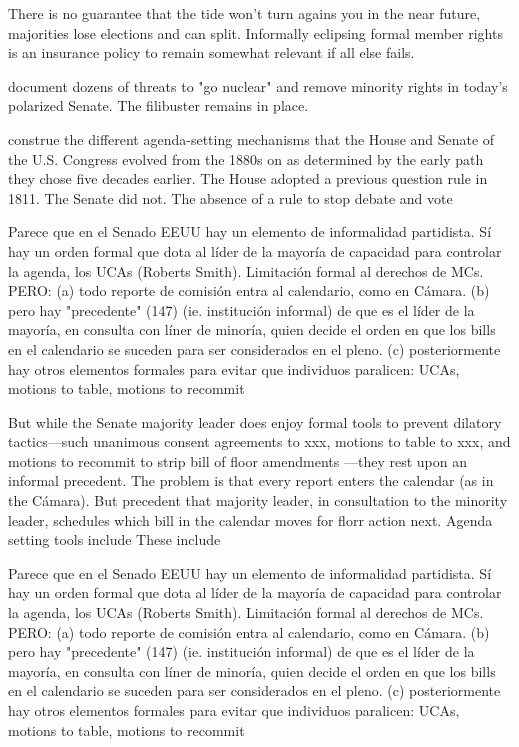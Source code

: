 There is no guarantee that the tide won't turn agains you in the near future, majorities lose elections and can split. Informally eclipsing formal member rights is an insurance policy to remain somewhat relevant if all else fails.

\citet{wawro.schickler.filibuster.2007} document dozens of threats to "go nuclear" and remove minority rights in today's polarized Senate. The filibuster remains in place. 




\citet{roberts-smith.2007} construe the different agenda-setting mechanisms that the House and Senate of the U.S. Congress evolved from the 1880s on as determined by the early path they chose five decades earlier. The House adopted a previous question rule in 1811. The Senate did not. The absence of a rule to stop debate and vote

Parece que en el Senado EEUU hay un elemento de informalidad partidista. Sí hay un orden formal que dota al líder de la mayoría de capacidad para controlar la agenda, los UCAs (Roberts Smith). Limitación formal al derechos de MCs. PERO: 
(a) todo reporte de comisión entra al calendario, como en Cámara.
(b) pero hay "precedente" (147) (ie. institución informal) de que es el líder de la mayoría, en consulta con líner de minoría, quien decide el orden en que los bills en el calendario se suceden para ser considerados en el pleno.
(c) posteriormente hay otros elementos formales para evitar que individuos paralicen: UCAs, motions to table, motions to recommit \citet{roberts-smith.2007,campbell.cox.mccubbins.2002}



 


 

But while the Senate majority leader does enjoy formal tools to prevent dilatory tactics---such unanimous consent agreements to xxx, motions to table to xxx, and motions to recommit to strip bill of floor amendments \citep{roberts-smith.2007,campbell.cox.mccubbins.2002}---they rest upon an informal precedent.
The problem is that every report enters the calendar (as in the Cámara). But precedent that majority leader, in consultation to the minority leader, schedules which bill in the calendar moves for florr action next. Agenda setting tools include These include 

Parece que en el Senado EEUU hay un elemento de informalidad partidista. Sí hay un orden formal que dota al líder de la mayoría de capacidad para controlar la agenda, los UCAs (Roberts Smith). Limitación formal al derechos de MCs. PERO: 
(a) todo reporte de comisión entra al calendario, como en Cámara.
(b) pero hay "precedente" (147) (ie. institución informal) de que es el líder de la mayoría, en consulta con líner de minoría, quien decide el orden en que los bills en el calendario se suceden para ser considerados en el pleno.
(c) posteriormente hay otros elementos formales para evitar que individuos paralicen: UCAs, motions to table, motions to recommit \citet{roberts-smith.2007,campbell.cox.mccubbins.2002}





